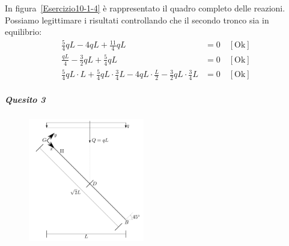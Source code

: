 In figura~\ref{Esercizio10-1-4} è rappresentato il quadro completo delle reazioni. Possiamo legittimare i risultati controllando che il secondo tronco sia in equilibrio:
\begin{subequations}
\begin{align}
\frac{5}{4}qL - 4qL + \frac{11}{4}qL &= 0 \quad [\text{Ok}] \label{equazione10-1-5a} \tag{10.1.5a} \\
\frac{qL}{4} - \frac{3}{2}qL + \frac{5}{4} qL &= 0 \quad [\text{Ok}] \label{equazione10-1-5b} \tag{10.1.5b} \\ 
\frac{5}{4}qL \cdot L + \frac{5}{4} qL \cdot \frac{3}{4} L - 4qL\cdot \frac{L}{2} - \frac{3}{2}qL \cdot \frac{3}{4} L &= 0 \quad [\text{Ok}] \label{equazione10-1-5c} \tag{10.1.5c}
\end{align}
\end{subequations}
\subparagraph{Quesito 3}
\renewcommand{\thefigure}{10.1~-~5}
\begin{figure}[ht]
\centering
\includegraphics[width=0.45\textwidth]{Immagini/Parte_10/Esercizio10_1_1/Esercizio10_1_5.pdf}
\caption{}
\label{Esercizio10-1-5}
\end{figure}
\renewcommand{\thefigure}{10.1~-~6}
